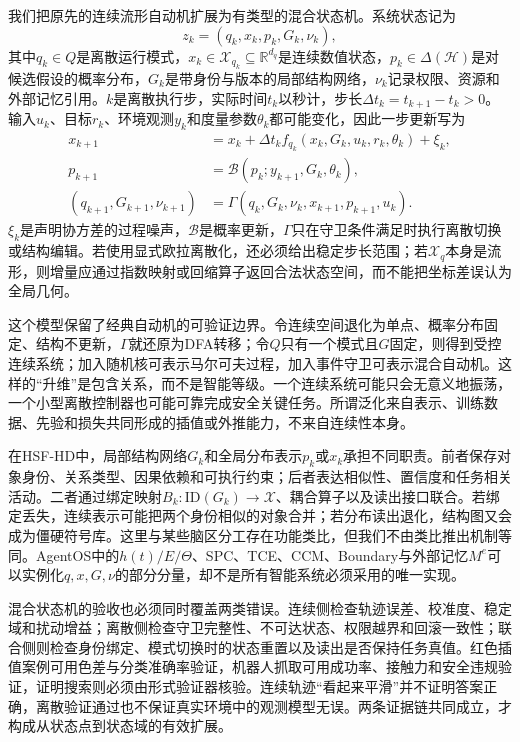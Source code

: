 我们把原先的连续流形自动机扩展为有类型的混合状态机。系统状态记为
\[
z_k=(q_k,x_k,p_k,G_k,\nu_k),
\]
其中$q_k\in Q$是离散运行模式，$x_k\in\mathcal X_{q_k}\subseteq\mathbb R^{d_q}$是连续数值状态，$p_k\in\Delta(\mathcal H)$是对候选假设的概率分布，$G_k$是带身份与版本的局部结构网络，$\nu_k$记录权限、资源和外部记忆引用。$k$是离散执行步，实际时间$t_k$以秒计，步长$\Delta t_k=t_{k+1}-t_k>0$。输入$u_k$、目标$r_k$、环境观测$y_k$和度量参数$\theta_k$都可能变化，因此一步更新写为
\[
\begin{aligned}
x_{k+1}&=x_k+\Delta t_k
 f_{q_k}(x_k,G_k,u_k,r_k,\theta_k)+\xi_k,\\
p_{k+1}&=\mathcal B(p_k;y_{k+1},G_k,\theta_k),\\
(q_{k+1},G_{k+1},\nu_{k+1})
&=\Gamma(q_k,G_k,\nu_k,x_{k+1},p_{k+1},u_k).
\end{aligned}
\]
$\xi_k$是声明协方差的过程噪声，$\mathcal B$是概率更新，$\Gamma$只在守卫条件满足时执行离散切换或结构编辑。若使用显式欧拉离散化，还必须给出稳定步长范围；若$\mathcal X_q$本身是流形，则增量应通过指数映射或回缩算子返回合法状态空间，而不能把坐标差误认为全局几何。

这个模型保留了经典自动机的可验证边界。令连续空间退化为单点、概率分布固定、结构不更新，$\Gamma$就还原为DFA转移；令$Q$只有一个模式且$G$固定，则得到受控连续系统；加入随机核可表示马尔可夫过程，加入事件守卫可表示混合自动机。这样的“升维”是包含关系，而不是智能等级。一个连续系统可能只会无意义地振荡，一个小型离散控制器也可能可靠完成安全关键任务。所谓泛化来自表示、训练数据、先验和损失共同形成的插值或外推能力，不来自连续性本身。

在HSF-HD中，局部结构网络$G_k$和全局分布表示$p_k$或$x_k$承担不同职责。前者保存对象身份、关系类型、因果依赖和可执行约束；后者表达相似性、置信度和任务相关活动。二者通过绑定映射$B_k:\mathrm{ID}(G_k)\rightarrow\mathcal X$、耦合算子以及读出接口联合。若绑定丢失，连续表示可能把两个身份相似的对象合并；若分布读出退化，结构图又会成为僵硬符号库。这里与某些脑区分工存在功能类比，但我们不由类比推出机制等同。AgentOS中的$h(t)/E/\Theta$、SPC、TCE、CCM、Boundary与外部记忆$M^e$可以实例化$q,x,G,\nu$的部分分量，却不是所有智能系统必须采用的唯一实现。

混合状态机的验收也必须同时覆盖两类错误。连续侧检查轨迹误差、校准度、稳定域和扰动增益；离散侧检查守卫完整性、不可达状态、权限越界和回滚一致性；联合侧则检查身份绑定、模式切换时的状态重置以及读出是否保持任务真值。红色插值案例可用色差与分类准确率验证，机器人抓取可用成功率、接触力和安全违规验证，证明搜索则必须由形式验证器核验。连续轨迹“看起来平滑”并不证明答案正确，离散验证通过也不保证真实环境中的观测模型无误。两条证据链共同成立，才构成从状态点到状态域的有效扩展。

